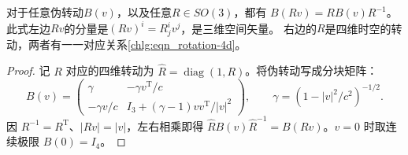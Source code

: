 \begin{proposition}\label{chlg:thm_b-rbr}
    对于任意伪转动$B(v)$，以及任意$R\in SO(3)$，都有
        $B(Rv) = R B(v) R^{-1}$。
    此式左边$Rv$的分量是$(Rv)^i = R^i_{j}v^j$，是三维空间矢量。
    右边的$R$是四维时空的转动，两者有一一对应关系\eqref{chlg:eqn_rotation-4d}。
\end{proposition}
\begin{proof}
    记 $R$ 对应的四维转动为 $\widehat R=\operatorname{diag}(1,R)$。将伪转动写成分块矩阵：
    \[
        B(v)=\begin{pmatrix}
            \gamma&-\gamma v^{\mathrm T}/c\\
            -\gamma v/c&I_3+(\gamma-1)vv^{\mathrm T}/|v|^2
        \end{pmatrix},\qquad \gamma=(1-|v|^2/c^2)^{-1/2}.
    \]
    因 $R^{-1}=R^{\mathrm T}$、$|Rv|=|v|$，左右相乘即得
    $\widehat R B(v)\widehat R^{-1}=B(Rv)$。$v=0$ 时取连续极限 $B(0)=I_4$。
\end{proof}

